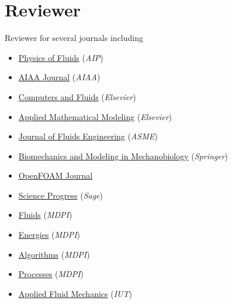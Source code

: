 \section*{Reviewer}{}
Reviewer for several journals including
\begin{itemize}[itemsep=0pt]
    \item \href{https://aip.scitation.org/journal/phf}{Physics of Fluids} (\emph{AIP})
    \item \href{https://arc.aiaa.org/aiaaj/about}{AIAA Journal} (\emph{AIAA})
    \item \href{https://www.journals.elsevier.com/computers-and-fluids}{Computers and Fluids} (\emph{Elsevier})
    \item \href{https://www.journals.elsevier.com/applied-mathematical-modelling}{Applied Mathematical Modeling} (\emph{Elsevier})
    \item \href{http://fluidsengineering.asmedigitalcollection.asme.org/journal.aspx}{Journal of Fluids Engineering} (\emph{ASME})
    \item \href{https://www.springer.com/journal/10237}{Biomechanics and Modeling in Mechanobiology} (\emph{Springer})
    \item \href{https://journal.openfoam.com/index.php/ofj}{OpenFOAM Journal}
    \item \href{https://journals.sagepub.com/home/sci}{Science Progress} (\emph{Sage})
    \item \href{https://www.mdpi.com/journal/fluids}{Fluids} (\emph{MDPI})
    \item \href{https://www.mdpi.com/journal/energies}{Energies} (\emph{MDPI})
    \item \href{https://www.mdpi.com/journal/algorithms}{Algorithms} (\emph{MDPI})
    \item \href{https://www.mdpi.com/journal/processes}{Processes} (\emph{MDPI})
    \item \href{http://jafmonline.net}{Applied Fluid Mechanics} (\emph{IUT})	
\end{itemize}
